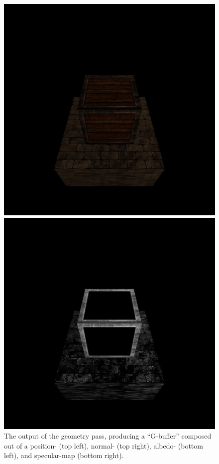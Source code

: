 \documentclass[format=sigconf]{acmart}
\begin{document}
\begin{figure}[h]
\begin{center}
\begin{minipage}{.2\textwidth}
    \end{minipage}
    \vskip0.04cm
    \begin{minipage}{.2\textwidth}
      \includegraphics[width=1.0\textwidth]{pipeline-albedo.png}
    \end{minipage}
    \begin{minipage}{.2\textwidth}
      \includegraphics[width=1.0\textwidth]{pipeline-specular.png}
    \end{minipage}
  \end{center}
  \caption{The output of the geometry pass, producing a ``G-buffer'' composed out of a position- (top left), normal- (top right), albedo- (bottom left), and specular-map (bottom right).}
  \label{fig:pipeline-gbuffer}
\end{figure}
\end{document}
